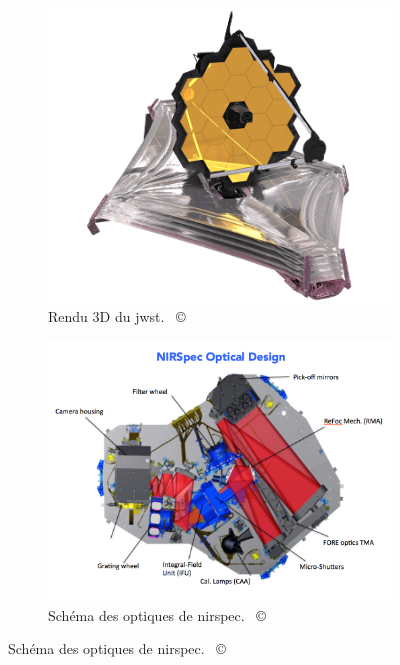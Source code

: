 \documentclass[11pt, a4paper]{article}
\newcommand{\customcite}[1]{\mbox{
  {\small \copyright} \cite{#1}}
}
\begin{document}
\begin{figure}
  \centering
     \begin{subfigure}[b]{0.45\textwidth}
         \centering
         \includegraphics[width=\textwidth]{assets/JWST_spacecraft_model_3.png}
         \caption{Rendu 3D du \gls{jwst}. \customcite{jwst_nasa}}
         \label{fig:jwst}
     \end{subfigure}
     \hfill
     \begin{subfigure}[b]{0.45\textwidth}
         \centering
         \includegraphics[width=\textwidth]{assets/NIRSpec_Optical_design.png}
         \caption{Schéma des optiques de \gls{nirspec}. \customcite{nirspec}}
         \label{fig:nirspec}
     \end{subfigure}
\end{figure}
\end{document}

